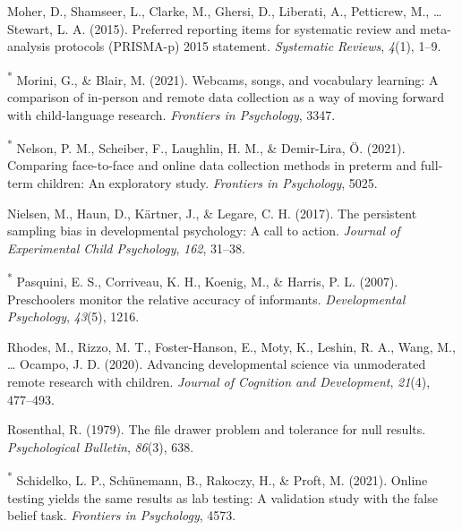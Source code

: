 \documentclass[
  man,floatsintext]{apa6}
\newlength{\cslhangindent}
\newlength{\cslentryspacingunit} %
\newenvironment{CSLReferences}[2] %
 {%
  \setlength{\parindent}{0pt}
  \ifodd #1
  \let\oldpar\par
  \def\par{\hangindent=\cslhangindent\oldpar}
  \fi
  \setlength{\parskip}{#2\cslentryspacingunit}
 }%
 {}
\begin{document}
\begin{CSLReferences}{1}{0}
\leavevmode{}%
Moher, D., Shamseer, L., Clarke, M., Ghersi, D., Liberati, A., Petticrew, M., \ldots{} Stewart, L. A. (2015). Preferred reporting items for systematic review and meta-analysis protocols (PRISMA-p) 2015 statement. \emph{Systematic Reviews}, \emph{4}(1), 1--9.

\leavevmode{}%
\textsuperscript{*} Morini, G., \& Blair, M. (2021). Webcams, songs, and vocabulary learning: A comparison of in-person and remote data collection as a way of moving forward with child-language research. \emph{Frontiers in Psychology}, 3347.

\leavevmode{}%
\textsuperscript{*} Nelson, P. M., Scheiber, F., Laughlin, H. M., \& Demir-Lira, Ö. (2021). Comparing face-to-face and online data collection methods in preterm and full-term children: An exploratory study. \emph{Frontiers in Psychology}, 5025.

\leavevmode{}%
Nielsen, M., Haun, D., Kärtner, J., \& Legare, C. H. (2017). The persistent sampling bias in developmental psychology: A call to action. \emph{Journal of Experimental Child Psychology}, \emph{162}, 31--38.

\leavevmode{}%
\textsuperscript{*} Pasquini, E. S., Corriveau, K. H., Koenig, M., \& Harris, P. L. (2007). Preschoolers monitor the relative accuracy of informants. \emph{Developmental Psychology}, \emph{43}(5), 1216.

\leavevmode{}%
Rhodes, M., Rizzo, M. T., Foster-Hanson, E., Moty, K., Leshin, R. A., Wang, M., \ldots{} Ocampo, J. D. (2020). Advancing developmental science via unmoderated remote research with children. \emph{Journal of Cognition and Development}, \emph{21}(4), 477--493.

\leavevmode{}%
Rosenthal, R. (1979). The file drawer problem and tolerance for null results. \emph{Psychological Bulletin}, \emph{86}(3), 638.

\leavevmode{}%
\textsuperscript{*} Schidelko, L. P., Schünemann, B., Rakoczy, H., \& Proft, M. (2021). Online testing yields the same results as lab testing: A validation study with the false belief task. \emph{Frontiers in Psychology}, 4573.


\end{CSLReferences}
\end{document}
